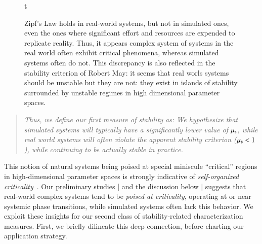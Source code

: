 \documentclass[onecolumn, compsoc,11pt]{IEEEtran}
\renewcommand{\captionN}[1]{\caption{\color{CadetBlue4!80!black} \sffamily \fontsize{10}{11}\selectfont #1  }}
\begin{document}
\begin{figure}{t}
\tikzexternalenable
\centering
 


\captionN{Zipf's Law holds in real-world systems, but not in simulated ones, even  the ones where  significant effort and resources are  expended  to  replicate reality. Thus, it appears complex system of systems in the real world often exhibit critical phenomena, whereas simulated systems often do not. This discrepancy is also reflected in the stability criterion of Robert May: it seems that real worls systems should be unstable but they are not: they exist in islands of stability surrounded by unstable regimes in high dimensional parameter spaces.}\label{figzipf}
\end{figure}
%
\begin{quote}\itshape 
Thus, we  define our first measure of stability as:
 We hypothesize that simulated systems will typically have a significantly lower value of $\mu_\S$, while real world systems will often violate the apparent stability criterion ($\mu_\S < 1$), while continuing to be actually stable in practice.
\end{quote}
This notion of natural systems being poised at special miniscule ``critical'' regions   in  high-dimensional parameter spaces  is strongly indicative of \textit{self-organized criticality}~\cite{mora2011biological}.  Our preliminary studies | and  the discussion below | suggests that real-world complex systems tend to be \textit{poised at criticality}, operating at or near systemic phase transitions, while simulated systems often lack this behavior. We exploit these insights  for our second class of  stability-related characterization measures. First, we briefly dilineate this deep  connection, before charting our  application strategy.

\end{document}
